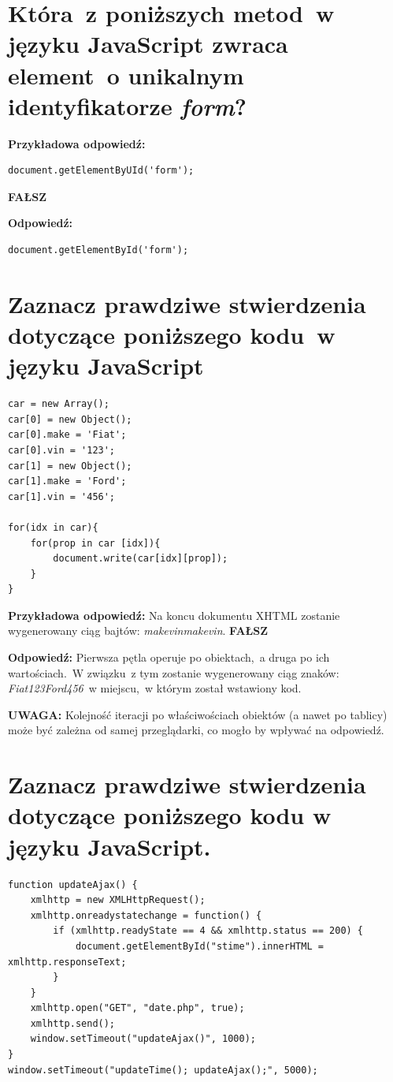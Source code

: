 \vspace{0.4cm}
\noindent

\section{Która~z poniższych metod~w języku JavaScript zwraca element~o unikalnym identyfikatorze \textit{form}?}
\noindent
{\textbf{Przykładowa odpowiedź:}}
\begin{lstlisting}[language=html]
document.getElementByUId('form');
\end{lstlisting}
\textbf{FAŁSZ}

\vspace{0.4cm}
\noindent
\textbf{Odpowiedź:}
\begin{lstlisting}[language=html]
document.getElementById('form');
\end{lstlisting}


\section{Zaznacz prawdziwe stwierdzenia dotyczące poniższego kodu~w języku JavaScript}

\begin{lstlisting}[language=html, frame=single]
car = new Array();
car[0] = new Object();
car[0].make = 'Fiat';
car[0].vin = '123';
car[1] = new Object();
car[1].make = 'Ford';
car[1].vin = '456';

for(idx in car){
    for(prop in car [idx]){
        document.write(car[idx][prop]);
    }
}
\end{lstlisting}
\noindent
{\textbf{Przykładowa odpowiedź:}}
Na koncu dokumentu XHTML zostanie wygenerowany ciąg bajtów: \textit{makevinmakevin}.
\textbf{FAŁSZ}

\vspace{0.4cm}
\noindent
\textbf{Odpowiedź:}
Pierwsza pętla operuje po obiektach,~a druga po ich wartościach.~W związku~z tym zostanie wygenerowany ciąg znaków:\\ \textit{Fiat123Ford456}~w miejscu,~w którym został wstawiony kod.

\vspace{0.4cm}

\noindent
\textbf{UWAGA:} Kolejność iteracji po właściwościach obiektów (a nawet po tablicy) może być zależna od samej przeglądarki, co mogło by wpływać na odpowiedź.

\section{Zaznacz prawdziwe stwierdzenia dotyczące poniższego kodu w języku JavaScript.}
\begin{lstlisting}
function updateAjax() {
    xmlhttp = new XMLHttpRequest();
    xmlhttp.onreadystatechange = function() {
        if (xmlhttp.readyState == 4 && xmlhttp.status == 200) {
            document.getElementById("stime").innerHTML = xmlhttp.responseText;
        }
    }
    xmlhttp.open("GET", "date.php", true);
    xmlhttp.send();
    window.setTimeout("updateAjax()", 1000);
}
window.setTimeout("updateTime(); updateAjax();", 5000);
\end{lstlisting}

